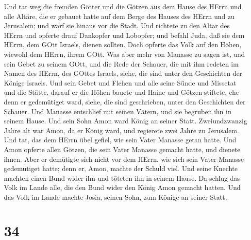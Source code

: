 Und tat weg die fremden Götter und die Götzen aus dem Hause des HErrn
und alle Altäre, die er gebauet hatte auf dem Berge des Hauses des HErrn
und zu Jerusalem; und warf sie hinaus vor die Stadt.  Und
richtete zu den Altar des HErrn und opferte drauf Dankopfer und
Lobopfer; und befahl Juda, daß sie dem HErrn, dem GOtt Israels, dienen
sollten.  Doch opferte das Volk auf den Höhen, wiewohl dem
HErrn, ihrem GOtt.  Was aber mehr von Manasse zu sagen ist,
und sein Gebet zu seinem GOtt, und die Rede der Schauer, die mit ihm
redeten im Namen des HErrn, des GOttes Israels, siehe, die sind unter
den Geschichten der Könige Israels.  Und sein Gebet und
Flehen und alle seine Sünde und Missetat und die Stätte, darauf er die
Höhen bauete und Haine und Götzen stiftete, ehe denn er gedemütiget
ward, siehe, die sind geschrieben, unter den Geschichten der Schauer.
 Und Manasse entschlief mit seinen Vätern, und sie begruben
ihn in seinem Hause. Und sein Sohn Amon ward König an seiner Statt.
 Zweiundzwanzig Jahre alt war Amon, da er König ward, und
regierete zwei Jahre zu Jerusalem.  Und tat, das dem HErrn
übel gefiel, wie sein Vater Manasse getan hatte. Und Amon opferte allen
Götzen, die sein Vater Manasse gemacht hatte, und dienete ihnen.
 Aber er demütigte sich nicht vor dem HErrn, wie sich sein
Vater Manasse gedemütiget hatte; denn er, Amon, machte der Schuld viel.
 Und seine Knechte machten einen Bund wider ihn und töteten
ihn in seinem Hause.  Da schlug das Volk im Lande alle, die
den Bund wider den König Amon gemacht hatten. Und das Volk im Lande
machte Josia, seinen Sohn, zum Könige an seiner Statt.

\hypertarget{section-33}{%
\section{34}\label{section-33}}


